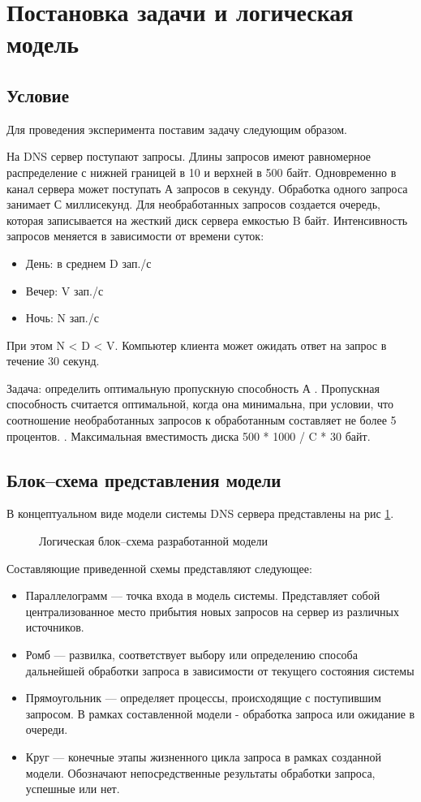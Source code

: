 \newpage
\section{Постановка задачи и логическая модель}
\subsection{Условие}
Для проведения эксперимента поставим задачу следующим образом.

На DNS сервер поступают запросы. Длины запросов имеют равномерное распределение с нижней границей
в 10 и верхней в 500 байт. Одновременно в канал сервера может поступать А запросов в секунду. Обработка одного
запроса занимает С миллисекунд. Для необработанных запросов создается очередь, которая записывается
на жесткий диск сервера емкостью B байт. Интенсивность запросов меняется в зависимости от времени суток:
\begin{itemize}
    \item День: в среднем D зап./с
    \item Вечер: V зап./с
    \item Ночь: N зап./с
\end{itemize}

При этом N < D < V. Компьютер клиента может ожидать ответ на запрос в течение 30 секунд.

Задача: определить оптимальную пропускную способность А . Пропускная способность считается оптимальной, когда она минимальна, при условии,
что соотношение необработанных запросов к обработанным составляет не более 5 процентов.
. Максимальная вместимость диска 500 * 1000 / C * 30  байт.

\subsection{Блок--схема представления модели}
В концептуальном виде модели системы DNS сервера представлены на рис \ref{concept}.

\begin{figure} [h]
    \caption{Логическая блок--схема разработанной модели}
    \label{concept}
\end{figure}

Составляющие приведенной схемы представляют следующее:
\begin{itemize}
    \item Параллелограмм --- точка входа в модель системы. Представляет собой централизованное
    место прибытия новых запросов на сервер из различных источников.
    \item Ромб --- развилка, соответствует выбору или определению способа дальнейшей
    обработки запроса в зависимости от текущего состояния системы
    \item Прямоугольник --- определяет процессы, происходящие с поступившим запросом.
    В рамках составленной модели - обработка запроса или ожидание в очереди. 
    \item Круг --- конечные этапы жизненного цикла запроса в рамках созданной модели.
    Обозначают непосредственные результаты обработки запроса, успешные или нет.
\end{itemize}
\newpage

